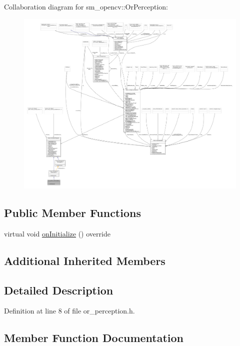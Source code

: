 Collaboration diagram for sm\+\_\+opencv\+:\+:Or\+Perception\+:
\nopagebreak
\begin{figure}[H]
\begin{center}
\leavevmode
\includegraphics[width=350pt]{classsm__opencv_1_1OrPerception__coll__graph}
\end{center}
\end{figure}
\subsection*{Public Member Functions}
\begin{DoxyCompactItemize}
\item 
virtual void \hyperlink{classsm__opencv_1_1OrPerception_a6f2cd09bbd6852b6283a0dff80c8803e}{on\+Initialize} () override
\end{DoxyCompactItemize}
\subsection*{Additional Inherited Members}


\subsection{Detailed Description}


Definition at line 8 of file or\+\_\+perception.\+h.



\subsection{Member Function Documentation}
\mbox{\label{classsm__opencv_1_1OrPerception_a6f2cd09bbd6852b6283a0dff80c8803e}} 
